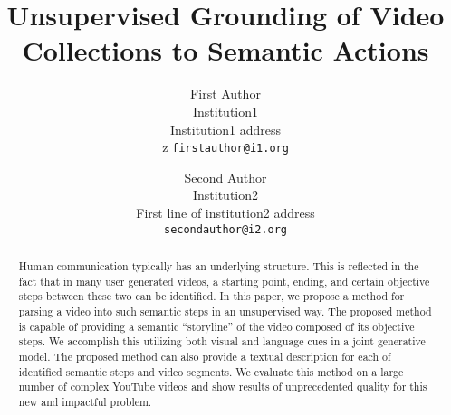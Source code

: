 \documentclass[10pt,twocolumn,letterpaper]{article}
\begin{document}
\title{Unsupervised Grounding of Video Collections to Semantic Actions}



\author{First Author\\
Institution1\\
Institution1 address\\z
{\tt\small firstauthor@i1.org}
\and
Second Author\\
Institution2\\
First line of institution2 address\\
{\tt\small secondauthor@i2.org}
}

\maketitle


\begin{abstract}
Human communication typically has an underlying structure. This is reflected in the fact that in many user generated videos, a starting point, ending, and certain objective steps between these two can be identified. In this paper, we propose a method for parsing a video into such semantic steps in an unsupervised way. The proposed method is capable of providing a semantic ``storyline'' of the video composed of its objective steps. We accomplish this utilizing both visual and language cues in a joint generative model. The proposed method can also provide a textual description for each of identified semantic steps and video segments. We evaluate this method on a large number of complex YouTube videos and show results of unprecedented quality for this new and impactful problem.
\end{abstract}








%

{\small


}
\end{document}
